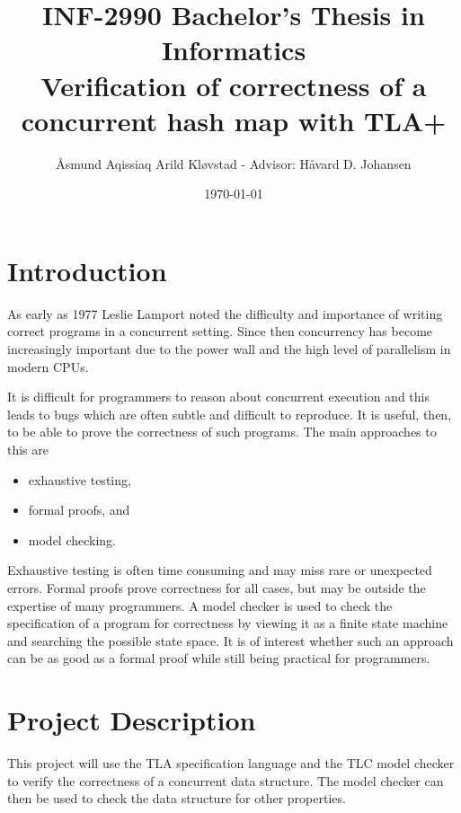 \documentclass[journal]{IEEEtran}
\begin{document}
\title{{\large INF-2990 Bachelor's Thesis in Informatics} \\ 
{\LARGE Verification of correctness of a concurrent hash map with TLA+}}


\author{Åsmund Aqissiaq Arild Kløvstad - Advisor: Håvard D. Johansen}
\date{\today}

\maketitle



\IEEEpeerreviewmaketitle

\section{Introduction}
As early as 1977 Leslie Lamport noted the difficulty and importance of writing correct programs in a concurrent setting\cite{Lamport1977}. Since then concurrency has become increasingly important due to the power wall and the high level of parallelism in modern CPUs\cite{Tanenbaum2014}.

It is difficult for programmers to reason about concurrent execution and this leads to bugs which are often subtle and difficult to reproduce\cite{Beschastnikh2016}. It is useful, then, to be able to prove the correctness of such programs. The main approaches to this are
\begin{itemize}
    \item exhaustive testing,
    \item formal proofs, and
    \item model checking.
\end{itemize}

Exhaustive testing is often time consuming and may miss rare or unexpected errors. Formal proofs prove correctness for all cases, but may be outside the expertise of many programmers. A model checker is used to check the specification of a program for correctness by viewing it as a finite state machine and searching the possible state space\cite{Clarke2009}. It is of interest whether such an approach can be as good as a formal proof while still being practical for programmers.



\section{Project Description}
This project will use the TLA specification language and the TLC model checker to verify the correctness of a concurrent data structure. The model checker can then be used to check the data structure for other properties.
\end{document}

